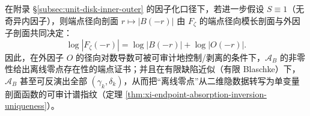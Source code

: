 \begin{corollary}\label{cor:xi-endpoint-tomography-certificate-chain}
在附录 \S\ref{subsec:unit-disk-inner-outer} 的因子化口径下，若进一步假设 \(S\equiv 1\)（无奇异内因子），则端点径向剖面 \(r\mapsto |B(-r)|\) 由 \(F_\zeta\) 的端点径向模长剖面与外因子剖面共同决定：
\[
\log|F_\zeta(-r)|=\log|B(-r)|+\log|O(-r)|.
\]
因此，在外因子 \(O\) 的径向对数导数可被可审计地控制/剥离的条件下，\(\mathcal{A}_B\) 的非零性给出离线零点存在性的端点证书；并且在有限缺陷近似（有限 Blaschke）下，\(\mathcal{A}_B\) 甚至可反演出全部 \((\gamma_k,\delta_k)\)，从而把“离线零点”从二维隐数据转写为单变量剖面函数的可审计谱指纹（定理 \ref{thm:xi-endpoint-absorption-inversion-uniqueness}）。
\end{corollary}

\endinput

